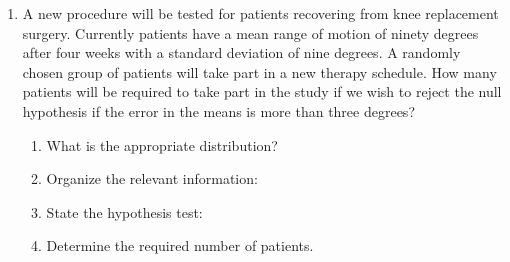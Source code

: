\documentclass[12pt]{article}
\begin{document}
\begin{enumerate}
\clearpage

\item A new procedure will be tested for patients recovering from knee
  replacement surgery. Currently patients have a mean range of motion
  of ninety degrees after four weeks with a standard deviation of nine
  degrees. A randomly chosen group of patients will take part in a new
  therapy schedule. How many patients will be required to take part in
  the study if we wish to reject the null hypothesis if the error in
  the means is more than three degrees?

  \begin{enumerate}
  \item What is the appropriate distribution? 
  \item Organize the relevant information: \\ [30pt]
  \item State the hypothesis test: \\ [20pt]
  \item Determine the required number of patients.
    \vfill
  \end{enumerate}




\end{enumerate}
\end{document}
